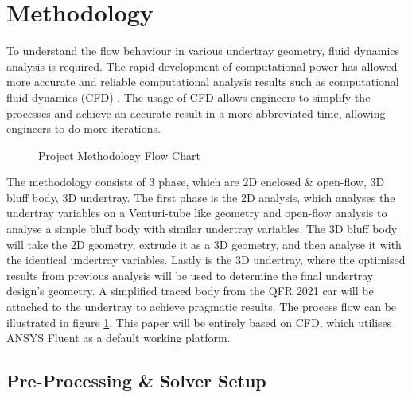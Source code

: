 \section{Methodology}
To understand the flow behaviour in various undertray geometry, fluid dynamics analysis is required. The rapid development of computational power has allowed more accurate and reliable computational analysis results such as computational fluid dynamics (CFD) \cite{Andersson2011ComputationalEngineers}. The usage of CFD allows engineers to simplify the processes and achieve an accurate result in a more abbreviated time, allowing engineers to do more iterations. 

\begin{figure}[!htb]
    \centering
    \caption{Project Methodology Flow Chart}
    \label{fig:project methodology}
\end{figure}

\noindent The methodology consists of 3 phase, which are 2D enclosed \& open-flow, 3D bluff body, 3D undertray. The first phase is the 2D analysis, which analyses the undertray variables on a Venturi-tube like geometry and open-flow analysis to analyse a simple bluff body with similar undertray variables. The 3D bluff body will take the 2D geometry, extrude it as a 3D geometry, and then analyse it with the identical undertray variables. Lastly is the 3D undertray, where the optimised results from previous analysis will be used to determine the final undertray design's geometry. A simplified traced body from the QFR 2021 car will be attached to the undertray to achieve pragmatic results. The process flow can be illustrated in figure \ref{fig:project methodology}. This paper will be entirely based on CFD, which utilises ANSYS Fluent as a default working platform.

\subsection{Pre-Processing \& Solver Setup}

